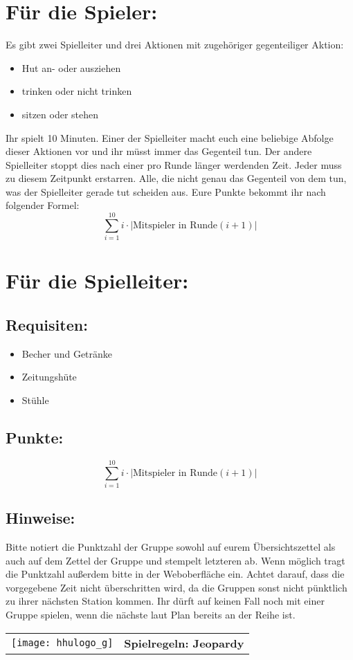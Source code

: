 \documentclass[a4paper,10pt]{article}
\def\spielf{Jeopardy}
\newcommand{\unten}{
 Bitte notiert die Punktzahl der Gruppe sowohl auf eurem Übersichtszettel als auch auf dem Zettel der Gruppe und stempelt letzteren ab. Wenn möglich tragt die Punktzahl außerdem bitte in der Weboberfläche ein.
 Achtet darauf, dass die vorgegebene Zeit nicht überschritten wird, da die Gruppen sonst nicht pünktlich zu ihrer nächsten Station kommen. Ihr dürft auf keinen Fall noch mit einer Gruppe spielen, wenn die nächste laut Plan bereits an der Reihe ist.
}
\begin{document}
\Large
\section*{Für die Spieler:}
Es gibt zwei Spielleiter und drei Aktionen mit zugehöriger gegenteiliger Aktion: 
\begin{itemize}
 \item Hut an- oder ausziehen
 \item trinken oder nicht trinken
 \item sitzen oder stehen
\end{itemize}
Ihr spielt 10 Minuten. Einer der Spielleiter macht euch eine beliebige Abfolge dieser Aktionen vor und ihr müsst immer das Gegenteil tun. Der andere Spielleiter stoppt dies nach einer pro Runde länger werdenden Zeit. Jeder muss zu diesem Zeitpunkt erstarren. Alle, die nicht genau das Gegenteil von dem tun, was der Spielleiter gerade tut scheiden aus. Eure Punkte bekommt ihr nach folgender Formel:\\
$$\sum\limits_{i=1}^{10}i \cdot |\mbox{Mitspieler in Runde}  (i+1)|$$


\section*{Für die Spielleiter:}
\subsection*{Requisiten:}
\begin{itemize}
 \item Becher und Getränke
 \item Zeitungshüte
 \item Stühle 
\end{itemize}
\subsection*{Punkte:}
$$\sum\limits_{i=1}^{10}i \cdot |\mbox{Mitspieler in Runde} (i+1)|$$

\subsection*{Hinweise:}
\unten

\newpage


  \begin{tabularx}{\textwidth}{lc}
    \texttt{[image: hhulogo\_g]}
  & {\Huge \textbf{Spielregeln: \spielf}}
  \end{tabularx}\\
\end{document}
